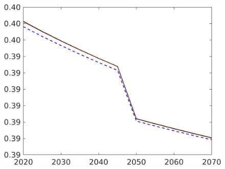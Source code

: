 \begin{figure}[h!!]
\begin{minipage}[]{0.32\textwidth}
	\end{minipage}
	\begin{minipage}[]{0.32\textwidth}
		\includegraphics[width=1\textwidth]{../../codding_model/own_basedOnFried/optimalPol_190722_tidiedUp/figures/all_10Aout22/EY_CompEffOPT_T_NoTaus_benchregime3_pol2_spillover0_noskill1_sep1_xgrowth1_PV1_etaa0.79_lgd0_lff0.png}
	\end{minipage}
\end{figure} 

